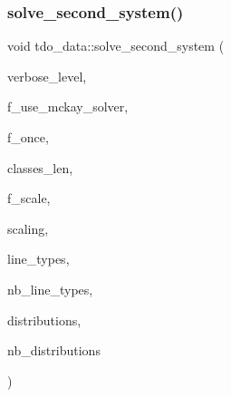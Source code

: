 \subsubsection{\texorpdfstring{solve\+\_\+second\+\_\+system()}{solve\_second\_system()}}
{\footnotesize\ttfamily void tdo\+\_\+data\+::solve\+\_\+second\+\_\+system (\begin{DoxyParamCaption}\item[{\mbox{\hyperlink{galois_8h_a09fddde158a3a20bd2dcadb609de11dc}{I\+NT}}}]{verbose\+\_\+level,  }\item[{\mbox{\hyperlink{galois_8h_a09fddde158a3a20bd2dcadb609de11dc}{I\+NT}}}]{f\+\_\+use\+\_\+mckay\+\_\+solver,  }\item[{\mbox{\hyperlink{galois_8h_a09fddde158a3a20bd2dcadb609de11dc}{I\+NT}}}]{f\+\_\+once,  }\item[{\mbox{\hyperlink{galois_8h_a09fddde158a3a20bd2dcadb609de11dc}{I\+NT}} $\ast$}]{classes\+\_\+len,  }\item[{\mbox{\hyperlink{galois_8h_a09fddde158a3a20bd2dcadb609de11dc}{I\+NT}}}]{f\+\_\+scale,  }\item[{\mbox{\hyperlink{galois_8h_a09fddde158a3a20bd2dcadb609de11dc}{I\+NT}}}]{scaling,  }\item[{\mbox{\hyperlink{galois_8h_a09fddde158a3a20bd2dcadb609de11dc}{I\+NT}} $\ast$\&}]{line\+\_\+types,  }\item[{\mbox{\hyperlink{galois_8h_a09fddde158a3a20bd2dcadb609de11dc}{I\+NT}} \&}]{nb\+\_\+line\+\_\+types,  }\item[{\mbox{\hyperlink{galois_8h_a09fddde158a3a20bd2dcadb609de11dc}{I\+NT}} $\ast$\&}]{distributions,  }\item[{\mbox{\hyperlink{galois_8h_a09fddde158a3a20bd2dcadb609de11dc}{I\+NT}} \&}]{nb\+\_\+distributions }\end{DoxyParamCaption})}

\mbox{\label{classtdo__data_a4376152d0929301f23a86753dd948650}} 

